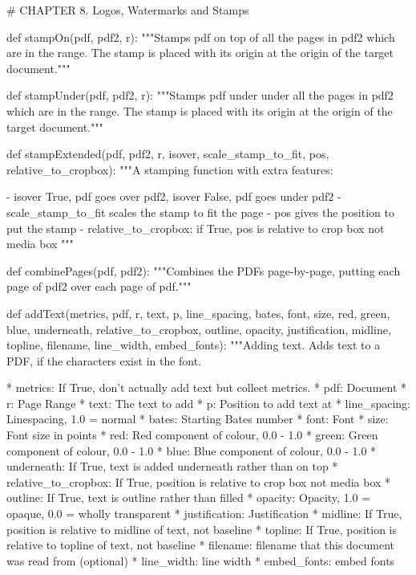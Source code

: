 # CHAPTER 8. Logos, Watermarks and Stamps

def stampOn(pdf, pdf2, r):
    """Stamps pdf on top of all the pages in pdf2 which are in the range. The
    stamp is placed with its origin at the origin of the target document."""

def stampUnder(pdf, pdf2, r):
    """Stamps pdf under under all the pages in pdf2 which are in the range. The
    stamp is placed with its origin at the origin of the target document."""

def stampExtended(pdf, pdf2, r, isover, scale_stamp_to_fit, pos,
                  relative_to_cropbox):
    """A stamping function with extra features:

     - isover True, pdf goes over pdf2, isover False, pdf goes under pdf2
     - scale_stamp_to_fit scales the stamp to fit the page
     - pos gives the position to put the stamp
     - relative_to_cropbox: if True, pos is relative to crop box not media box
    """

def combinePages(pdf, pdf2):
    """Combines the PDFs page-by-page, putting each page of pdf2 over each page
    of pdf."""

def addText(metrics, pdf, r, text, p, line_spacing, bates, font, size, red,
            green, blue, underneath, relative_to_cropbox, outline, opacity,
            justification, midline, topline, filename, line_width,
            embed_fonts):
    """Adding text. Adds text to a PDF, if the characters exist in the font.

         * metrics: If True, don't actually add text but collect metrics.
         * pdf:	Document
         * r: Page Range
         * text: The text to add
         * p: Position to add text at
         * line_spacing: Linespacing, 1.0 = normal
         * bates: Starting Bates number
         * font: Font
         * size: Font size in points
         * red: Red component of colour, 0.0 - 1.0
         * green: Green component of colour, 0.0 - 1.0
         * blue: Blue component of colour, 0.0 - 1.0
         * underneath: If True, text is added underneath rather than on top
         * relative_to_cropbox: If True, position is relative to crop box not
           media box
         * outline: If True, text is outline rather than filled
         * opacity: Opacity, 1.0 = opaque, 0.0 = wholly transparent
         * justification: Justification
         * midline: If True, position is relative to midline of text, not
           baseline
         * topline: If True, position is relative to topline of text, not
           baseline
         * filename: filename that this document was read from (optional)
         * line_width: line width
         * embed_fonts: embed fonts

